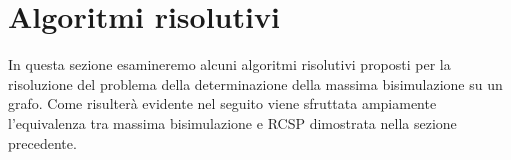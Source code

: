\section{Algoritmi risolutivi}
\label{sec:algs}
In questa sezione esamineremo alcuni algoritmi risolutivi proposti per la risoluzione del problema della determinazione della massima bisimulazione su un grafo. Come risulterà evidente nel seguito viene sfruttata ampiamente l'equivalenza tra massima bisimulazione e RCSP dimostrata nella sezione precedente.





